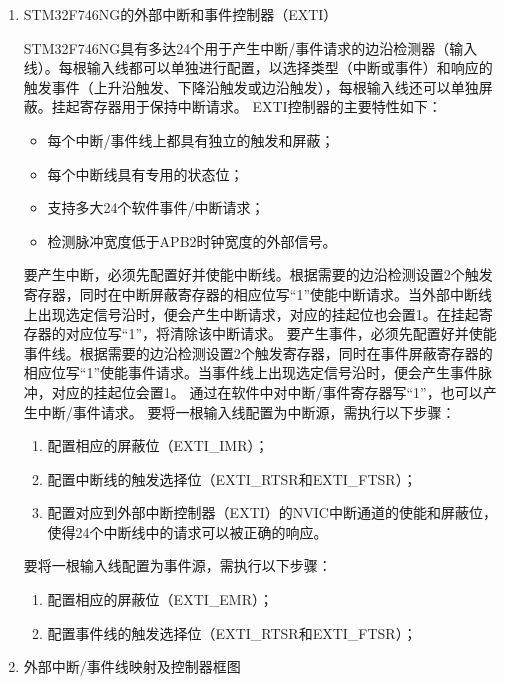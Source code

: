 ﻿\documentclass[UTF8,12pt]{article}
\begin{document}
\begin{enumerate}
  \item STM32F746NG的外部中断和事件控制器（EXTI）
  
  STM32F746NG具有多达24个用于产生中断/事件请求的边沿检测器（输入线）。每根输入线都可以单独进行配置，以选择类型（中断或事件）和响应的触发事件（上升沿触发、下降沿触发或边沿触发），每根输入线还可以单独屏蔽。挂起寄存器用于保持中断请求。
  EXTI控制器的主要特性如下：
  \begin{itemize}
    \item 每个中断/事件线上都具有独立的触发和屏蔽；
    \item 每个中断线具有专用的状态位；
    \item 支持多大24个软件事件/中断请求；
    \item 检测脉冲宽度低于APB2时钟宽度的外部信号。
  \end{itemize}
  要产生中断，必须先配置好并使能中断线。根据需要的边沿检测设置2个触发寄存器，同时在中断屏蔽寄存器的相应位写“1”使能中断请求。当外部中断线上出现选定信号沿时，便会产生中断请求，对应的挂起位也会置1。在挂起寄存器的对应位写“1”，将清除该中断请求。
  要产生事件，必须先配置好并使能事件线。根据需要的边沿检测设置2个触发寄存器，同时在事件屏蔽寄存器的相应位写“1”使能事件请求。当事件线上出现选定信号沿时，便会产生事件脉冲，对应的挂起位会置1。
  通过在软件中对中断/事件寄存器写“1”，也可以产生中断/事件请求。
  要将一根输入线配置为中断源，需执行以下步骤：
  \begin{enumerate}
    \item 配置相应的屏蔽位（EXTI\_IMR）；
    \item 配置中断线的触发选择位（EXTI\_RTSR和EXTI\_FTSR）；
    \item 配置对应到外部中断控制器（EXTI）的NVIC中断通道的使能和屏蔽位，使得24个中断线中的请求可以被正确的响应。
  \end{enumerate}
  要将一根输入线配置为事件源，需执行以下步骤：
  \begin{enumerate}
    \item 配置相应的屏蔽位（EXTI\_EMR）；
    \item 配置事件线的触发选择位（EXTI\_RTSR和EXTI\_FTSR）；
  \end{enumerate}
  \item 外部中断/事件线映射及控制器框图
  

\end{enumerate}
\end{document}
